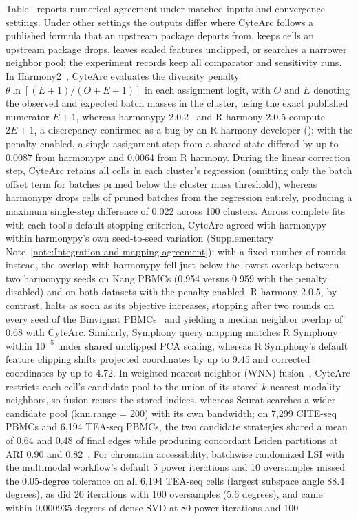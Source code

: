 \label{note:Documented non-equivalences}

Table~ reports numerical agreement under matched inputs and convergence settings. Under other settings the outputs differ where CyteArc follows a published formula that an upstream package departs from, keeps cells an upstream package drops, leaves scaled features unclipped, or searches a narrower neighbor pool; the experiment records keep all comparator and sensitivity runs. In Harmony2~\cite{korsunsky2019,patikas2026integration}, CyteArc evaluates the diversity penalty $\theta\ln[(E+1)/(O+E+1)]$ in each assignment logit, with $O$ and $E$ denoting the observed and expected batch masses in the cluster, using the exact published numerator $E+1$, whereas harmonypy 2.0.2~\cite{slowikowski2026slowkowharmonypy} and R harmony 2.0.5 compute $2E+1$, a discrepancy confirmed as a bug by an R harmony developer (); with the penalty enabled, a single assignment step from a shared state differed by up to 0.0087 from harmonypy and 0.0064 from R harmony. During the linear correction step, CyteArc retains all cells in each cluster's regression (omitting only the batch offset term for batches pruned below the cluster mass threshold), whereas harmonypy drops cells of pruned batches from the regression entirely, producing a maximum single-step difference of 0.022 across 100 clusters. Across complete fits with each tool's default stopping criterion, CyteArc agreed with harmonypy within harmonypy's own seed-to-seed variation (Supplementary Note~\ref{note:Integration and mapping agreement}); with a fixed number of rounds instead, the overlap with harmonypy fell just below the lowest overlap between two harmonypy seeds on Kang PBMCs (0.954 versus 0.959 with the penalty disabled) and on both datasets with the penalty enabled. R harmony 2.0.5, by contrast, halts as soon as its objective increases, stopping after two rounds on every seed of the Binvignat PBMCs~\cite{binvignat2024} and yielding a median neighbor overlap of 0.68 with CyteArc. Similarly, Symphony query mapping matches R Symphony~\cite{kang2021} within $10^{-5}$ under shared unclipped PCA scaling, whereas R Symphony's default feature clipping shifts projected coordinates by up to 9.45 and corrected coordinates by up to 4.72. In weighted nearest-neighbor (WNN) fusion~\cite{hao2021}, CyteArc restricts each cell's candidate pool to the union of its stored $k$-nearest modality neighbors, so fusion reuses the stored indices, whereas Seurat searches a wider candidate pool (knn.range = 200) with its own bandwidth; on 7,299 CITE-seq PBMCs and 6,194 TEA-seq PBMCs, the two candidate strategies shared a mean of 0.64 and 0.48 of final edges while producing concordant Leiden partitions at ARI 0.90 and 0.82~\cite{hao2021,swanson2021}. For chromatin accessibility, batchwise randomized LSI with the multimodal workflow's default 5 power iterations and 10 oversamples missed the 0.05-degree tolerance on all 6,194 TEA-seq cells (largest subspace angle 88.4 degrees), as did 20 iterations with 100 oversamples (5.6 degrees), and came within 0.000935 degrees of dense SVD at 80 power iterations and 100 